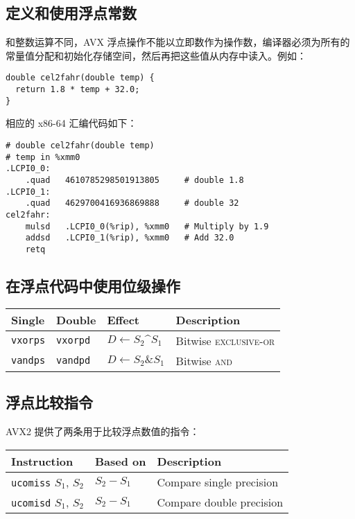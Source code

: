 \subsection{定义和使用浮点常数}

和整数运算不同，AVX 浮点操作不能以立即数作为操作数，编译器必须为所有的常量值分配和初始化存储空间，然后再把这些值从内存中读入。例如：

\begin{verbatim}
double cel2fahr(double temp) {
  return 1.8 * temp + 32.0;
}
\end{verbatim}

相应的 x86-64 汇编代码如下：

\begin{verbatim}
# double cel2fahr(double temp)
# temp in %xmm0
.LCPI0_0:
    .quad   4610785298501913805     # double 1.8
.LCPI0_1:
    .quad   4629700416936869888     # double 32
cel2fahr:
    mulsd   .LCPI0_0(%rip), %xmm0   # Multiply by 1.9
    addsd   .LCPI0_1(%rip), %xmm0   # Add 32.0
    retq
\end{verbatim}

\subsection{在浮点代码中使用位级操作}

\begin{table}[!ht]
    \centering
    \begin{tabular}{llll}
        \toprule
        Single & Double & Effect & Description \\
        \midrule
        \texttt{vxorps} & \texttt{vxorpd} & $D \leftarrow S_2 \^{} S_1$ & Bitwise \textsc{exclusive-or} \\
        \texttt{vandps} & \texttt{vandpd} & $D \leftarrow S_2 \& S_1$ & Bitwise \textsc{and} \\
        \bottomrule
    \end{tabular}
\end{table}

\subsection{浮点比较指令}

AVX2 提供了两条用于比较浮点数值的指令：

\begin{table}[!ht]
    \centering
    \begin{tabular}{lll}
        \toprule
        Instruction & Based on & Description \\
        \midrule
        \texttt{ucomiss} $S_1$, $S_2$ & $S_2 - S_1$ & Compare single precision \\
        \texttt{ucomisd} $S_1$, $S_2$ & $S_2 - S_1$ & Compare double precision \\
        \bottomrule
    \end{tabular}
\end{table}

